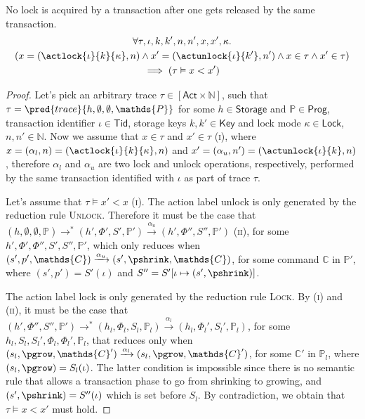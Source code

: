 \lem \label{lem:2phase} No lock is acquired by a transaction after one gets released by the same transaction.
\begin{gather*}
	\forall \tau, \iota, k, k', n, n', x, x', \kappa \ldotp \\
	\left( x = (\actlock{\iota}{k}{\kappa}, n) \land x' = (\actunlock{\iota}{k'}, n') \land x \in \tau \land x' 	\in \tau \right) \\
	\implies \left( \tau \vDash x < x' \right)
\end{gather*}

\begin{proof}
Let's pick an arbitrary trace $\tau \in [\mathsf{Act} \times \mathds{N}]$, such that $\tau = \pred{trace}{h, \emptyset, \emptyset, \mathds{P}}$ for some $h \in \mathsf{Storage}$ and $\mathds{P} \in \mathsf{Prog}$, transaction identifier $\iota \in \mathsf{Tid}$, storage keys $k, k' \in \mathsf{Key}$ and lock mode $\kappa \in \mathsf{Lock}$, $n, n' \in \mathds{N}$. Now we assume that  $x \in \tau$ and $x' \in \tau$ (\textsc{i}), where $x = (\alpha_l, n) = (\actlock{\iota}{k}{\kappa}, n)$ and $x' = (\alpha_u, n') = (\actunlock{\iota}{k}, n)$, therefore $\alpha_l$ and $\alpha_u$ are two lock and unlock operations, respectively, performed by the same transaction identified with $\iota$ as part of trace $\tau$.

Let's assume that $\tau \vDash x' < x$ (\textsc{i}). The action label \textsf{unlock} is only generated by the reduction rule \textsc{Unlock}. Therefore it must be the case that $(h, \emptyset, \emptyset, \mathds{P}) \rightarrow^* (h', \Phi', S', \mathds{P}') \xrightarrow{\alpha_u} (h', \Phi'', S'', \mathds{P}')$ (\textsc{ii}), for some $h', \Phi', \Phi'', S', S'', \mathds{P}'$, which only reduces when $(s', p', \mathds{C}) \xrightarrow{\alpha_u} (s', \pshrink, \mathds{C})$, for some command $\mathds{C}$ in $\mathds{P}'$, where $(s', p') = S'(\iota)$ and $S'' = S'[\iota \mapsto (s', \pshrink)]$.

The action label \textsf{lock} is only generated by the reduction rule \textsc{Lock}. By (\textsc{i}) and (\textsc{ii}), it must be the case that $(h', \Phi'', S'', \mathds{P}') \rightarrow^* (h_l, \Phi_l, S_l, \mathds{P}_l) \xrightarrow{\alpha_l} (h_l, \Phi_l', S_l', \mathds{P}_l)$, for some $h_l, S_l, S_l', \Phi_l, \Phi_l', \mathds{P}_l$, that reduces only when $(s_l, \pgrow, \mathds{C}') \xrightarrow{\alpha_l} (s_l, \pgrow, \mathds{C}')$, for some $\mathds{C}'$ in $\mathds{P}_l$, where $(s_l, \pgrow) = S_l(\iota)$. The latter condition is impossible since there is no semantic rule that allows a transaction phase to go from shrinking to growing, and $(s', \pshrink) = S''(\iota)$ which is set before $S_l$. By contradiction, we obtain that $\tau \vDash x < x'$ must hold.
\end{proof}

